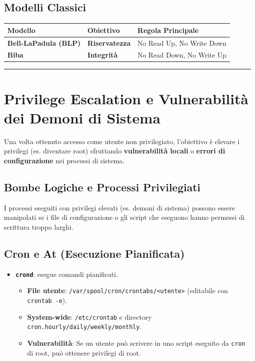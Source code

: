 \documentclass[12pt, a4paper]{report}
\begin{document}
\subsection{Modelli Classici}

\begin{table}[H]
	\centering
	\begin{tabular}{|l|l|l|}
		\hline
		\textbf{Modello} & \textbf{Obiettivo} & \textbf{Regola Principale} \\ \hline
		\textbf{Bell-LaPadula (BLP)} & \textbf{Riservatezza} & No Read Up, No Write Down \\ \hline
		\textbf{Biba} & \textbf{Integrità} & No Read Down, No Write Up \\ \hline
	\end{tabular}
\end{table}

\noindent\rule{\textwidth}{0.4pt}

\section{Privilege Escalation e Vulnerabilità dei Demoni di Sistema}

Una volta ottenuto accesso come utente non privilegiato, l'obiettivo è elevare i privilegi (es. diventare root) sfruttando \textbf{vulnerabilità locali} o \textbf{errori di configurazione} nei processi di sistema.

\subsection{Bombe Logiche e Processi Privilegiati}
I processi eseguiti con privilegi elevati (es. demoni di sistema) possono essere manipolati se i file di configurazione o gli script che eseguono hanno permessi di scrittura troppo larghi.

\subsection{Cron e At (Esecuzione Pianificata)}
\begin{itemize}
	\item \textbf{\texttt{crond}}: esegue comandi pianificati.
	\begin{itemize}
		\item \textbf{File utente}: \texttt{/var/spool/cron/crontabs/<utente>} (editabile con \texttt{crontab -e}).
		\item \textbf{System-wide}: \texttt{/etc/crontab} e directory \texttt{cron.hourly/daily/weekly/monthly}.
		\item \textbf{Vulnerabilità}: Se un utente può scrivere in uno script eseguito da \texttt{cron} di root, può ottenere privilegi di root.
	\end{itemize}
\end{itemize}
\end{document}
